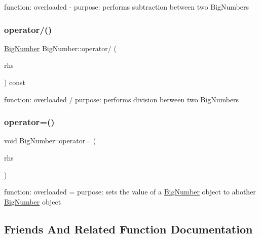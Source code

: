 function\+: overloaded -\/ purpose\+: performs subtraction between two Big\+Numbers \mbox{\label{class_big_number_a316d5af647df31aec92e0614af856957}} 
\subsubsection{\texorpdfstring{operator/()}{operator/()}}
{\footnotesize\ttfamily \mbox{\hyperlink{class_big_number}{Big\+Number}} Big\+Number\+::operator/ (\begin{DoxyParamCaption}\item[{const \mbox{\hyperlink{class_big_number}{Big\+Number}} \&}]{rhs }\end{DoxyParamCaption}) const\hspace{0.3cm}{\ttfamily [inline]}}

function\+: overloaded / purpose\+: performs division between two Big\+Numbers \mbox{\label{class_big_number_a334532c27eb7e5d0ae7a2940127b499b}} 
\subsubsection{\texorpdfstring{operator=()}{operator=()}}
{\footnotesize\ttfamily void Big\+Number\+::operator= (\begin{DoxyParamCaption}\item[{const \mbox{\hyperlink{class_big_number}{Big\+Number}} \&}]{rhs }\end{DoxyParamCaption})\hspace{0.3cm}{\ttfamily [inline]}}

function\+: overloaded = purpose\+: sets the value of a \mbox{\hyperlink{class_big_number}{Big\+Number}} object to abother \mbox{\hyperlink{class_big_number}{Big\+Number}} object 

\subsection{Friends And Related Function Documentation}
\mbox{\label{class_big_number_a862a0b741309e4033e9eee7285b5dd67}} 
